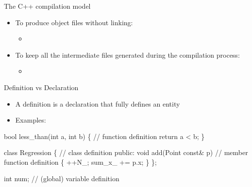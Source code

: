 \begin{frame}[fragile]{The C++ compilation model \insertcontinuationtext}
\begin{center}
    \end{center}

    \begin{itemize}
    \item<2-> To produce object files without linking:
      \begin{itemize}
      \item {}
      \end{itemize}
    \item<2-> To keep all the intermediate files generated during the compilation process:
      \begin{itemize}
      \item {}
      \end{itemize}
    \end{itemize}

\end{frame}

\begin{frame}[fragile]{Definition vs Declaration}

  \begin{itemize}
  \item A \alert{definition} is a declaration that fully defines an entity
  \item Examples:
  \end{itemize}

  \begin{codeblock}
bool less_than(int a, int b) \{ // function definition
  return a < b;
\}

class Regression \{ // class definition
 public:
  void add(Point const& p) // member function definition
  \{
    ++N_;
    sum_x_ += p.x;
    \ddd
  \}
  \ddd
\};

int num; // (global) variable definition\end{codeblock}

\end{frame}

